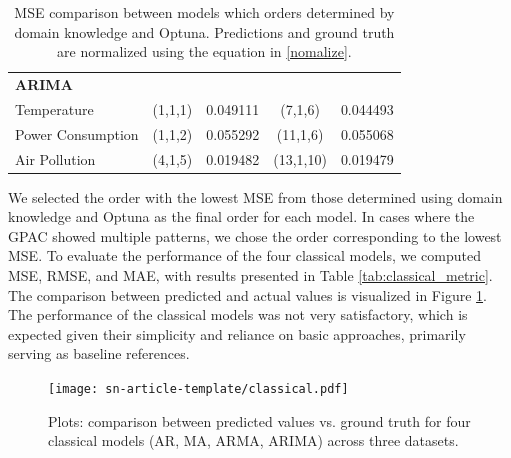 \documentclass[sn-mathphys-num]{sn-jnl}
\theoremstyle{thmstyleone}%
\theoremstyle{thmstyletwo}%
\theoremstyle{thmstylethree}%
\begin{document}
\begin{table}[h]
\begin{tabular}{@{}lcccc@{}}
\textbf{ARIMA}            &                                 &                  &                       &                  \\
Temperature             & (1,1,1)                         & 0.049111         & (7,1,6)               & 0.044493         \\
Power Consumption       & (1,1,2)                         & 0.055292         & (11,1,6)              & 0.055068         \\
Air Pollution           & (4,1,5)                         & 0.019482         & (13,1,10)             & 0.019479         \\ \bottomrule
\end{tabular}
\caption{MSE comparison between models which orders determined by domain knowledge and Optuna. Predictions and ground truth are normalized using the equation in \ref{nomalize}.}
\label{tab:optuna}
\end{table}
We selected the order with the lowest MSE from those determined using domain knowledge and Optuna as the final order for each model. In cases where the GPAC showed multiple patterns, we chose the order corresponding to the lowest MSE. To evaluate the performance of the four classical models, we computed MSE, RMSE, and MAE, with results presented in Table \ref{tab:classical_metric}. The comparison between predicted and actual values is visualized in Figure \ref{fig:classical_perf}. The performance of the classical models was not very satisfactory, which is expected given their simplicity and reliance on basic approaches, primarily serving as baseline references.

\begin{figure}[]
	\begin{center}
		\texttt{[image: sn-article-template/classical.pdf]}
	\end{center}
	\caption{Plots: comparison between predicted values vs. ground truth for four classical models (AR, MA, ARMA, ARIMA) across three datasets.}
	\label{fig:classical_perf}
\end{figure}
\end{document}
